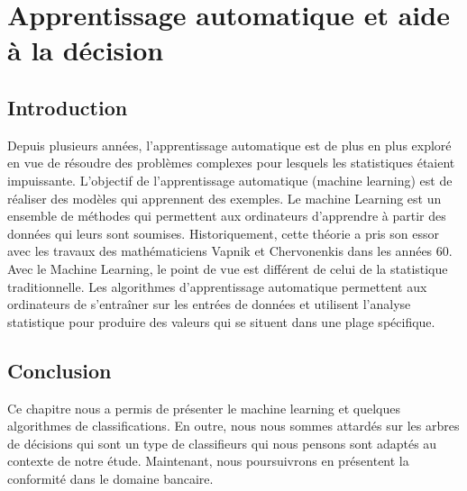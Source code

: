 \chapter{Apprentissage automatique et aide à la décision}

\section*{Introduction}

Depuis plusieurs années, l'apprentissage automatique est de plus en plus exploré
en vue de résoudre des problèmes complexes pour lesquels les statistiques
étaient impuissante. L'objectif de l'apprentissage automatique (machine
learning) est de réaliser des modèles qui apprennent des exemples.
Le machine Learning est un ensemble de méthodes qui permettent aux ordinateurs
d'apprendre à partir des données qui leurs sont soumises. Historiquement,
cette théorie a pris son essor avec les travaux des mathématiciens Vapnik et
Chervonenkis dans les années 60. Avec le Machine Learning, le point de vue est
différent de celui de la statistique traditionnelle. Les algorithmes d'apprentissage
automatique permettent aux ordinateurs de s'entraîner sur les entrées de données et 
utilisent l'analyse statistique pour produire des valeurs qui se situent dans une 
plage spécifique.



%









\section*{Conclusion}

Ce chapitre nous a permis de présenter le machine learning et quelques algorithmes 
de classifications. En outre, nous nous sommes attardés sur les arbres de décisions 
qui sont un type de classifieurs qui nous pensons sont adaptés au contexte de notre étude.
Maintenant, nous poursuivrons en  présentent la conformité dans le domaine bancaire.
